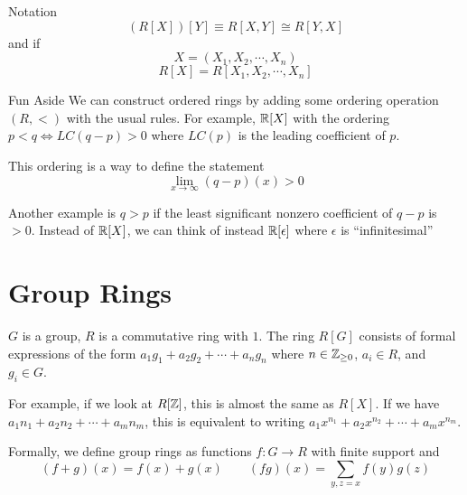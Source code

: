 \documentclass[a4paper,twoside,master.tex]{subfiles}
\begin{document}
\begin{note}{Notation}
    \begin{equation}
        (R[X])[Y] \equiv R[X,Y] \cong R[Y,X]
    \end{equation}
    and if
    \begin{equation}
        X = (X_1, X_2, \cdots, X_n)
    \end{equation}
    \begin{equation}
        R[X] = R[X_1, X_2, \cdots, X_n]
    \end{equation}
\end{note}

\begin{note}{Fun Aside}
    We can construct ordered rings by adding some ordering operation $ (R, <) $ with the usual rules. For example, $ \mathbb{R}[X] $ with the ordering $ p<q \iff LC(q-p) > 0 $ where $ LC(p) $ is the leading coefficient of $ p $.

    This ordering is a way to define the statement
    \begin{equation}
        \lim_{x \to \infty} (q-p)(x) > 0
    \end{equation}

    Another example is $ q>p $ if the least significant nonzero coefficient of $ q - p $ is $ >0 $. Instead of $ \mathbb{R}[X] $, we can think of instead $ \mathbb{R}[\epsilon] $ where $ \epsilon $ is ``infinitesimal''
\end{note}

\section{Group Rings}
\label{sec:group_rings}

\begin{definition}
    $ G $ is a group, $ R $ is a commutative ring with $ 1 $. The ring $ R[G] $ consists of formal expressions of the form $ a_1 g_1 + a_2 g_2 + \cdots + a_n g_n $ where $ n \in \mathbb{Z}_{\geq 0} $, $ a_i \in R $, and $ g_i \in G $.
\end{definition}

For example, if we look at $ R[\mathbb{Z}] $, this is almost the same as $ R[X] $. If we have $ a_1 n_1 + a_2 n_2 + \cdots + a_m n_m $, this is equivalent to writing $ a_1 x^{n_1} + a_2 x^{n_2} + \cdots + a_m x^{n_m} $.

Formally, we define group rings as functions $ f\colon G \to R $ with finite support and
\begin{equation}
    (f+g)(x) = f(x) + g(x)\qquad (fg)(x) = \sum_{y,z = x} f(y) g(z)
\end{equation}
\end{document}
